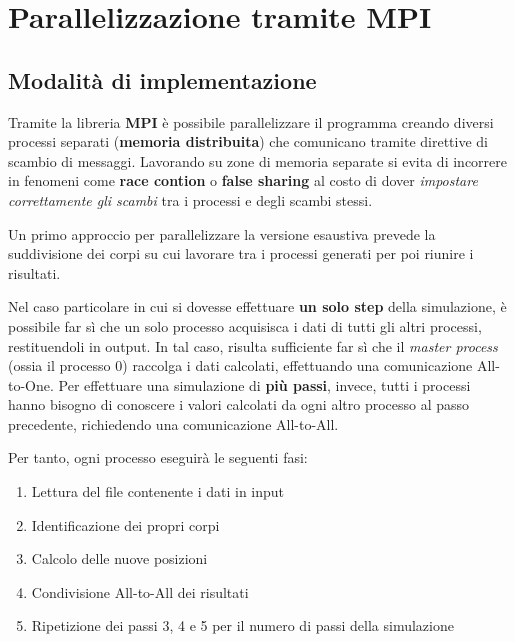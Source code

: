 \documentclass[12pt]{report}
\begin{document}
    \newpage

    \newpage

    \section{Parallelizzazione tramite MPI}

    \subsection{Modalità di implementazione}

    Tramite la libreria \textbf{MPI} è possibile parallelizzare il programma creando diversi processi separati (\textbf{memoria distribuita}) che comunicano tramite direttive di scambio di messaggi. Lavorando su zone di memoria separate si evita di incorrere in fenomeni come \textbf{race contion} o \textbf{false sharing} al costo di dover \textit{impostare correttamente gli scambi} tra i processi e degli scambi stessi.

    Un primo approccio per parallelizzare la versione esaustiva prevede la suddivisione dei corpi su cui lavorare tra i processi generati per poi riunire i risultati.
    
    Nel caso particolare in cui si dovesse effettuare \textbf{un solo step} della simulazione, è possibile far sì che un solo processo acquisisca i dati di tutti gli altri processi, restituendoli in output. In tal caso, risulta sufficiente far sì che il \textit{master process} (ossia il processo 0) raccolga i dati calcolati, effettuando una comunicazione All-to-One. Per effettuare una simulazione di \textbf{più passi}, invece, tutti i processi hanno bisogno di conoscere i valori calcolati da ogni altro processo al passo precedente, richiedendo una comunicazione All-to-All.

    Per tanto, ogni processo eseguirà le seguenti fasi:
    \begin{enumerate}
        \item Lettura del file contenente i dati in input
        \item Identificazione dei propri corpi
        \item Calcolo delle nuove posizioni 
        \item Condivisione All-to-All dei risultati
        \item Ripetizione dei passi 3, 4 e 5 per il numero di passi della simulazione 
    \end{enumerate}
\end{document}
